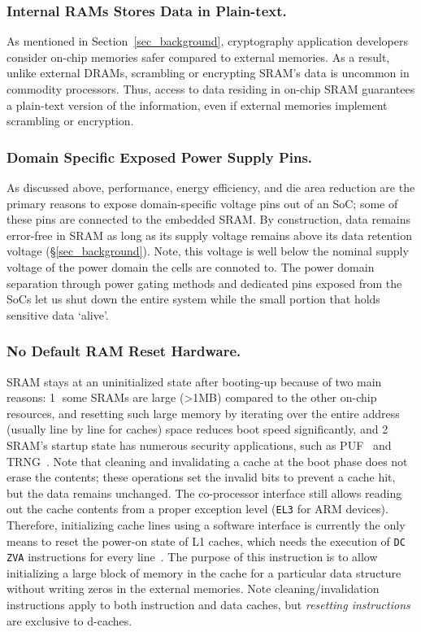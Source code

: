 \subsubsection{Internal RAMs Stores Data in Plain-text.}
 
As mentioned in Section~\ref{sec_background}, cryptography application developers consider on-chip memories safer compared to external memories. 
As a result, unlike external DRAMs, scrambling or encrypting SRAM's data is uncommon in commodity processors. 
Thus, access to data residing in on-chip SRAM guarantees a plain-text version of the information, even if external memories implement scrambling or encryption.

\subsubsection{Domain Specific Exposed Power Supply Pins.}

As discussed above, performance, energy efficiency, and die area reduction are the primary reasons to expose domain-specific voltage pins out of an SoC;
some of these pins are connected to the embedded SRAM.
By construction, data remains error-free in SRAM as long as its supply voltage remains above its data retention voltage (\S\ref{sec_background}). 
Note, this voltage is well below the nominal supply voltage of the power domain the cells are connoted to.
The power domain separation through power gating methods and dedicated pins exposed from the SoCs let us shut down the entire system while the small portion that holds sensitive data `alive'.

\subsubsection{No Default RAM Reset Hardware.}

SRAM stays at an uninitialized state after booting-up because of two main reasons: \textcircled{1} some SRAMs are large (>1MB) compared to the other on-chip resources, and resetting such large memory by iterating over the entire address (usually line by line for caches) space reduces boot speed significantly, and \textcircled{2} SRAM's startup state has numerous security applications, such as PUF~\cite{roelke2016attacking} and TRNG~\cite{holcomb_power-up_2009}. 
Note that cleaning and invalidating a cache at the boot phase does not erase the contents;
these operations set the invalid bits to prevent a cache hit, but the data remains unchanged. 
The co-processor interface still allows reading out the cache contents from a proper exception level (\texttt{EL3} for ARM devices). 
Therefore, initializing cache lines using a software interface is currently the only means to reset the power-on state of L1 caches, which needs the execution of \texttt{DC ZVA} instructions for every line~\cite{a53Trm,A72}. 
The purpose of this instruction is to allow initializing a large block of memory in the cache for a particular data structure without writing zeros in the external memories. 
Note cleaning/invalidation instructions apply to both instruction and data caches, but \textit{resetting instructions} are exclusive to d-caches. 

